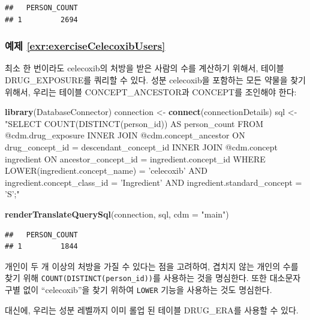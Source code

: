 \documentclass[10.5pt]{book}
\newenvironment{Shaded}{\begin{snugshade}}{\end{snugshade}}
\newcommand{\KeywordTok}[1]{\textcolor[rgb]{0.13,0.29,0.53}{\textbf{#1}}}
\newcommand{\DataTypeTok}[1]{\textcolor[rgb]{0.13,0.29,0.53}{#1}}
\newcommand{\StringTok}[1]{\textcolor[rgb]{0.31,0.60,0.02}{#1}}
\newcommand{\NormalTok}[1]{#1}
\theoremstyle{definition}
\theoremstyle{definition}
\theoremstyle{definition}
\theoremstyle{remark}
\begin{document}
\begin{verbatim}
##   PERSON_COUNT
## 1         2694
\end{verbatim}

\subsubsection*{예제
\ref{exr:exerciseCelecoxibUsers}}\label{-refexrexercisecelecoxibusers}

최소 한 번이라도 celecoxib의 처방을 받은 사람의 수를 계산하기 위해서,
테이블 DRUG\_EXPOSURE를 쿼리할 수 있다. 성분 celecoxib을 포함하는 모든
약물을 찾기 위해서, 우리는 테이블 CONCEPT\_ANCESTOR과 CONCEPT를 조인해야
한다:

\begin{Shaded}
\begin{Highlighting}[]
\KeywordTok{library}\NormalTok{(DatabaseConnector)}
\NormalTok{connection <-}\StringTok{ }\KeywordTok{connect}\NormalTok{(connectionDetails)}
\NormalTok{sql <-}\StringTok{ "SELECT COUNT(DISTINCT(person_id)) AS person_count}
\StringTok{FROM @cdm.drug_exposure}
\StringTok{INNER JOIN @cdm.concept_ancestor}
\StringTok{  ON drug_concept_id = descendant_concept_id}
\StringTok{INNER JOIN @cdm.concept ingredient}
\StringTok{  ON ancestor_concept_id = ingredient.concept_id}
\StringTok{WHERE LOWER(ingredient.concept_name) = 'celecoxib'}
\StringTok{  AND ingredient.concept_class_id = 'Ingredient'}
\StringTok{  AND ingredient.standard_concept = 'S';"}

\KeywordTok{renderTranslateQuerySql}\NormalTok{(connection, sql, }\DataTypeTok{cdm =} \StringTok{"main"}\NormalTok{)}
\end{Highlighting}
\end{Shaded}

\begin{verbatim}
##   PERSON_COUNT
## 1         1844
\end{verbatim}

개인이 두 개 이상의 처방을 가질 수 있다는 점을 고려하여, 겹치지 않는
개인의 수를 찾기 위해 \texttt{COUNT(DISTINCT(person\_id))}를 사용하는
것을 명심한다. 또한 대소문자 구별 없이 ``celecoxib''을 찾기 위하여
\texttt{LOWER} 기능을 사용하는 것도 명심한다.

대신에, 우리는 성분 레벨까지 이미 롤업 된 테이블 DRUG\_ERA를 사용할 수
있다.
\end{document}
